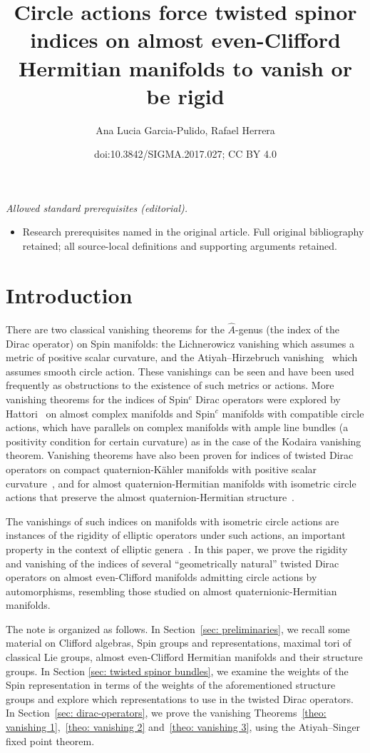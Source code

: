 \documentclass[10pt,a4paper]{amsart}
\title{Circle actions force twisted spinor indices on almost even-Clifford Hermitian manifolds to vanish or be rigid}
\author{Ana Lucia Garcia-Pulido, Rafael Herrera}
\date{doi:10.3842/SIGMA.2017.027; CC BY 4.0}
\newcommand{\A}{\mbox{$\widehat A$}}
\numberwithin{equation}{section}
\begin{document}
\maketitle
\noindent\textit{Allowed standard prerequisites (editorial).}\begin{itemize}
\item Research prerequisites named in the original article. Full original bibliography retained; all source-local definitions and supporting arguments retained.
\end{itemize}\medskip
\section{Introduction}

There are two classical vanishing theorems for the $\A$-genus (the index of the Dirac operator) on Spin manifolds: the Lichnerowicz vanishing \cite{Lichnerowicz} which assumes a metric of positive scalar curvature, and the Atiyah--Hirzebruch vanishing~\cite{AH} which assumes smooth circle action. These vanishings can be seen and have been used frequently as obstructions to the existence of such metrics or actions. More vanishing theorems for the indices of Spin$^c$ Dirac operators were explored by Hattori~\cite{Hattori} on almost complex manifolds and Spin$^c$ manifolds with compatible circle actions, which have parallels on complex manifolds with ample line bundles (a positivity condition for certain curvature) as in the case of the Kodaira vanishing theorem. Vanishing theorems have also been proven for indices of twisted Dirac operators on compact quaternion-K\"ahler manifolds with positive scalar curvature~\cite{LS}, and for almost quaternion-Hermitian manifolds with isometric circle actions that preserve the almost quaternion-Hermitian structure~\cite{Herrera-Herrera}.

The vanishings of such indices on manifolds with isometric circle actions are instances of the rigidity of elliptic operators under such actions,
an important property in the context of elliptic genera~\cite{BT,Dessai-rigidity,Hi-genera, HiSl,Liu, Taubes,W1, W2}. In this paper, we prove the rigidity and vanishing of the indices of several ``geometrically natural'' twisted Dirac operators on almost even-Clif\/ford manifolds admitting circle actions by automorphisms, resembling those studied on almost quaternionic-Hermitian manifolds.

The note is organized as follows. In Section~\ref{sec: preliminaries}, we recall some material on Clif\/ford algebras, Spin groups and representations, maximal tori of classical Lie groups, almost even-Clif\/ford Hermitian manifolds and their structure groups. In Section \ref{sec: twisted spinor bundles}, we examine the weights of the Spin representation in terms of the weights of the aforementioned structure groups and explore which representations to use in the twisted Dirac operators. In Section~\ref{sec: dirac-operators}, we prove the vanishing Theorems~\ref{theo: vanishing 1},~\ref{theo: vanishing 2} and~\ref{theo: vanishing 3}, using the Atiyah--Singer f\/ixed point theorem.
\end{document}
